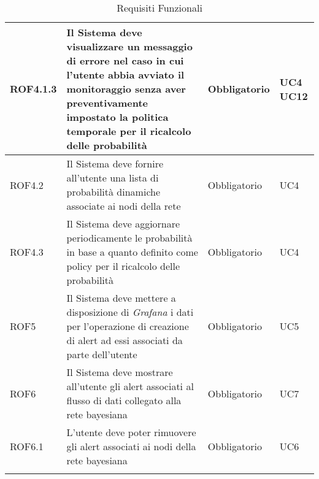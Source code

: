 \begin{center}
\begin{longtable}[c]{|m{}|m{}|m{}|m{}|}
\hline
\rowcolor{grigio}ROF4.1.3 & Il Sistema deve visualizzare un messaggio di errore nel caso in cui l'utente abbia avviato il monitoraggio senza aver preventivamente impostato la politica temporale per il ricalcolo delle probabilità & Obbligatorio & UC4 UC12\\
\hline
ROF4.2 & Il Sistema deve fornire all'utente una lista di probabilità dinamiche associate ai nodi della rete & Obbligatorio & UC4\\
\hline
\rowcolor{grigio}ROF4.3 & Il Sistema deve aggiornare periodicamente le probabilità in base a quanto definito come policy per il ricalcolo delle probabilità & Obbligatorio & UC4\\
\hline
ROF5 & Il Sistema deve mettere a disposizione di \textit{Grafana} i dati per l'operazione di creazione di alert ad essi associati da parte dell'utente & Obbligatorio & UC5\\
\hline
\rowcolor{grigio}ROF6 & Il Sistema deve mostrare all'utente gli alert associati al flusso di dati collegato alla rete bayesiana & Obbligatorio & UC7\\ 
\hline
ROF6.1 & L'utente deve poter rimuovere gli alert associati ai nodi della rete bayesiana & Obbligatorio & UC6\\ 
\hline
\caption{Requisiti Funzionali}
\end{longtable}
\end{center}



